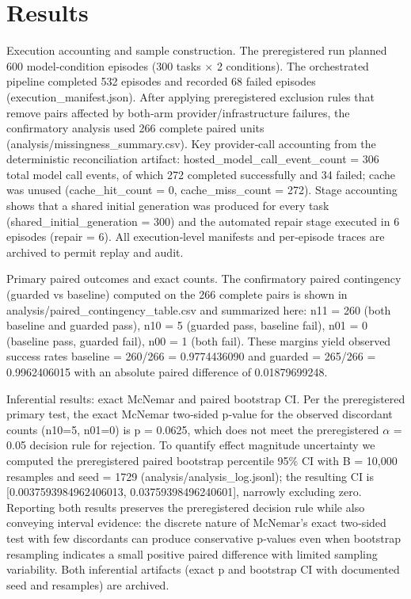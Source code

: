 \documentclass[conference]{IEEEtran}
\begin{document}
\section{Results}
Execution accounting and sample construction. The preregistered run planned 600 model‑condition episodes (300 tasks \ensuremath{\times} 2 conditions). The orchestrated pipeline completed 532 episodes and recorded 68 failed episodes (execution\_manifest.json). After applying preregistered exclusion rules that remove pairs affected by both‑arm provider/infrastructure failures, the confirmatory analysis used 266 complete paired units (analysis/missingness\_summary.csv). Key provider‑call accounting from the deterministic reconciliation artifact: hosted\_model\_call\_event\_count = 306 total model call events, of which 272 completed successfully and 34 failed; cache was unused (cache\_hit\_count = 0, cache\_miss\_count = 272). Stage accounting shows that a shared initial generation was produced for every task (shared\_initial\_generation = 300) and the automated repair stage executed in 6 episodes (repair = 6). All execution‑level manifests and per‑episode traces are archived to permit replay and audit.

Primary paired outcomes and exact counts. The confirmatory paired contingency (guarded vs baseline) computed on the 266 complete pairs is shown in analysis/paired\_contingency\_table.csv and summarized here: n11 = 260 (both baseline and guarded pass), n10 = 5 (guarded pass, baseline fail), n01 = 0 (baseline pass, guarded fail), n00 = 1 (both fail). These margins yield observed success rates baseline = 260/266 = 0.9774436090 and guarded = 265/266 = 0.9962406015 with an absolute paired difference of 0.01879699248.

Inferential results: exact McNemar and paired bootstrap CI. Per the preregistered primary test, the exact McNemar two‑sided p‑value for the observed discordant counts (n10=5, n01=0) is p = 0.0625, which does not meet the preregistered \ensuremath{\alpha} = 0.05 decision rule for rejection. To quantify effect magnitude uncertainty we computed the preregistered paired bootstrap percentile 95\% CI with B = 10,000 resamples and seed = 1729 (analysis/analysis\_log.jsonl); the resulting CI is [0.0037593984962406013, 0.03759398496240601], narrowly excluding zero. Reporting both results preserves the preregistered decision rule while also conveying interval evidence: the discrete nature of McNemar's exact two‑sided test with few discordants can produce conservative p‑values even when bootstrap resampling indicates a small positive paired difference with limited sampling variability. Both inferential artifacts (exact p and bootstrap CI with documented seed and resamples) are archived.
\end{document}
